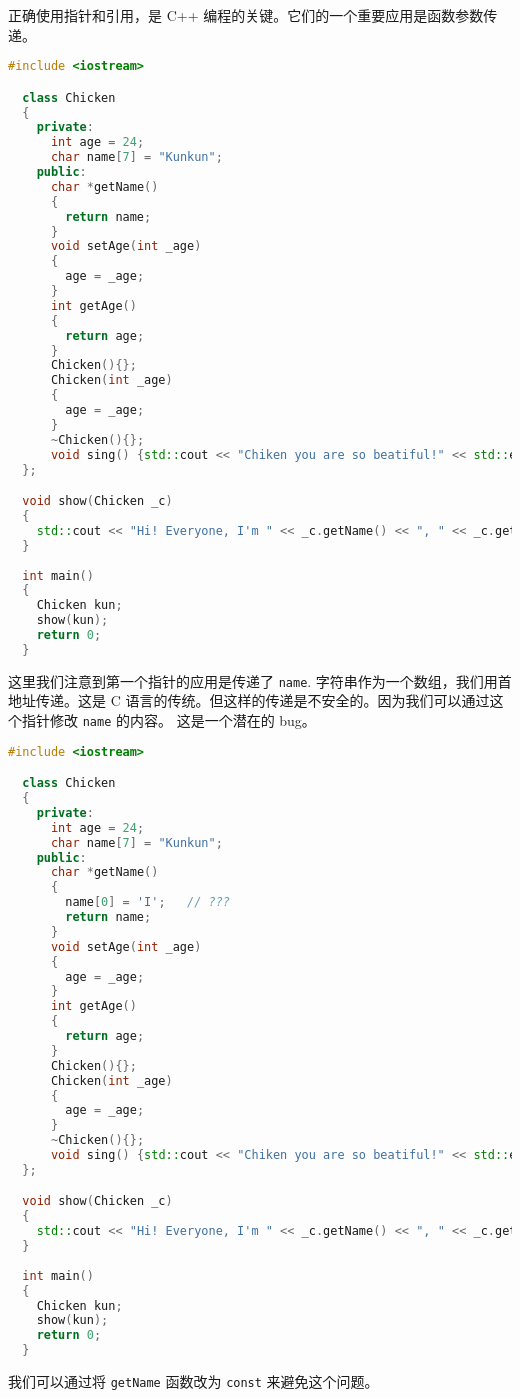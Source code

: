 \documentclass[a4paper]{ctexart}
\theoremstyle{definition}
\theoremstyle{definition}
\begin{document}
正确使用指针和引用，是 C++ 编程的关键。它们的一个重要应用是函数参数传递。

\begin{lstlisting}[language=C++]
  #include <iostream>

  class Chicken
  {
    private:
      int age = 24;
      char name[7] = "Kunkun";
    public:
      char *getName()
      {
        return name;
      }
      void setAge(int _age)
      {
        age = _age;
      }
      int getAge()
      {
        return age;
      }
      Chicken(){};
      Chicken(int _age)
      {
        age = _age;
      }
      ~Chicken(){};
      void sing() {std::cout << "Chiken you are so beatiful!" << std::endl;}      
  };

  void show(Chicken _c)
  {
    std::cout << "Hi! Everyone, I'm " << _c.getName() << ", " << _c.getAge() << " years old." << std::endl;
  }
  
  int main()
  {
    Chicken kun;
    show(kun);
    return 0;
  }
\end{lstlisting}

这里我们注意到第一个指针的应用是传递了 \verb|name|. 字符串作为一个数组，我们用首地址传递。这是 C 语言的传统。但这样的传递是不安全的。因为我们可以通过这个指针修改 \verb|name| 的内容。
这是一个潜在的 bug。

\begin{lstlisting}[language=C++]
  #include <iostream>

  class Chicken
  {
    private:
      int age = 24;
      char name[7] = "Kunkun";
    public:
      char *getName()
      {
        name[0] = 'I';   // ???
        return name;
      }
      void setAge(int _age)
      {
        age = _age;
      }
      int getAge()
      {
        return age;
      }
      Chicken(){};
      Chicken(int _age)
      {
        age = _age;
      }
      ~Chicken(){};
      void sing() {std::cout << "Chiken you are so beatiful!" << std::endl;}      
  };

  void show(Chicken _c)
  {
    std::cout << "Hi! Everyone, I'm " << _c.getName() << ", " << _c.getAge() << " years old." << std::endl;
  }
  
  int main()
  {
    Chicken kun;
    show(kun);
    return 0;
  }
\end{lstlisting}


我们可以通过将 \verb|getName| 函数改为 \verb|const| 来避免这个问题。
\end{document}
